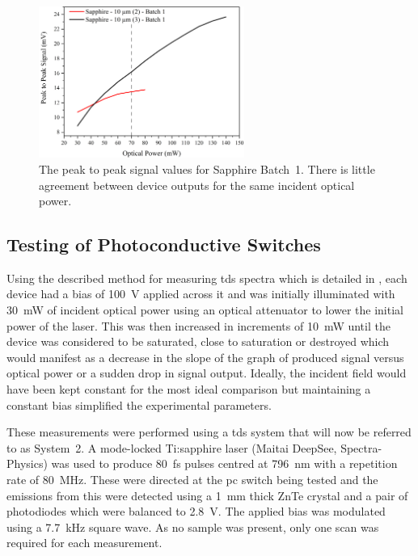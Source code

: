 \begin{figure}[h!]
    \centering
    \includegraphics[width=0.6\textwidth]{Figures/Misc/SysDev/Opt10MicronBatch1.png}
    \captionsetup{font = footnotesize, justification = centering}
    \caption[The Peak to Peak Signal Values for Sapphire Batch~1]{The peak to peak signal values for Sapphire Batch~1. There is little agreement between device outputs for the same incident optical power.}
    \label{fig:sapphbatch1}
\end{figure}

\subsection{Testing of Photoconductive Switches}
Using the described method for measuring \acrshort{tds} spectra which is detailed in , each device had a bias of \SI{100}{V} applied across it and was initially illuminated with \SI{30}{mW} of incident optical power using an optical attenuator to lower the initial power of the laser. This was then increased in increments of \SI{10}{mW} until the device was considered to be saturated, close to saturation or destroyed which would manifest as a decrease in the slope of the graph of produced signal versus optical power or a sudden drop in signal output. Ideally, the incident field would have been kept constant for the most ideal comparison but maintaining a constant bias simplified the experimental parameters.

These measurements were performed using a \acrshort{tds} system that will now be referred to as System~2. A mode\nobreakdash-locked Ti:sapphire laser (Maitai DeepSee, Spectra\nobreakdash-Physics) was used to produce \SI{80}{fs} pulses centred at \SI{796}{nm} with a repetition rate of \SI{80}{MHz}. These were directed at the \acrshort{pc} switch being tested and the emissions from this were detected using a \SI{1}{mm} thick ZnTe crystal and a pair of photodiodes which were balanced to \SI{2.8}{V}. The applied bias was modulated using a \SI{7.7}{kHz} square wave. As no sample was present, only one scan was required for each measurement.

